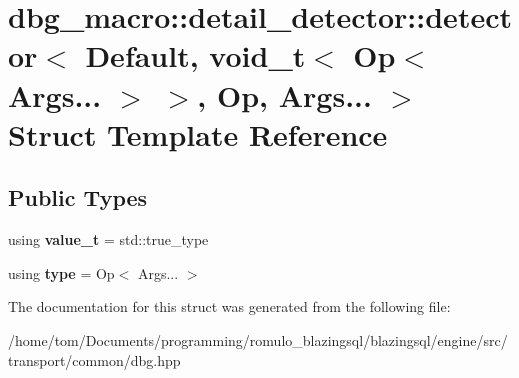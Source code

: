 \hypertarget{structdbg__macro_1_1detail__detector_1_1detector_3_01Default_00_01void__t_3_01Op_3_01Args_8_8_8_7a587da40c906bd309ce2dec06959c4d}{}\section{dbg\+\_\+macro\+:\+:detail\+\_\+detector\+:\+:detector$<$ Default, void\+\_\+t$<$ Op$<$ Args... $>$ $>$, Op, Args... $>$ Struct Template Reference}
\label{structdbg__macro_1_1detail__detector_1_1detector_3_01Default_00_01void__t_3_01Op_3_01Args_8_8_8_7a587da40c906bd309ce2dec06959c4d}
\subsection*{Public Types}
\begin{DoxyCompactItemize}
\item 
\mbox{\label{structdbg__macro_1_1detail__detector_1_1detector_3_01Default_00_01void__t_3_01Op_3_01Args_8_8_8_7a587da40c906bd309ce2dec06959c4d_aed88c72de9583bcc141d9c7bdbb08a40}} 
using {\bfseries value\+\_\+t} = std\+::true\+\_\+type
\item 
\mbox{\label{structdbg__macro_1_1detail__detector_1_1detector_3_01Default_00_01void__t_3_01Op_3_01Args_8_8_8_7a587da40c906bd309ce2dec06959c4d_a26b45e157c568f6b8d5ab6f935c3609f}} 
using {\bfseries type} = Op$<$ Args... $>$
\end{DoxyCompactItemize}


The documentation for this struct was generated from the following file\+:\begin{DoxyCompactItemize}
\item 
/home/tom/\+Documents/programming/romulo\+\_\+blazingsql/blazingsql/engine/src/transport/common/dbg.\+hpp\end{DoxyCompactItemize}
